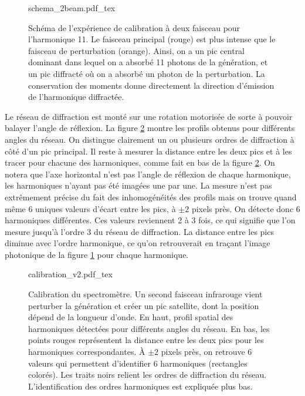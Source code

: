 \begin{figure}[!ht]
\centering
\def\svgwidth{\columnwidth}
{schema_2beam.pdf_tex}
\caption{Schéma de l'expérience de calibration à deux faisceau pour l'harmonique 11. Le faisceau principal (rouge) est plus intense que le faisceau de perturbation (orange). Ainsi, on a un pic central dominant dans lequel on a absorbé 11 photons de la génération, et un pic diffracté où on a absorbé un photon de la perturbation. La conservation des moments donne directement la direction d'émission de l'harmonique diffractée.}
\label{Fig:DiffSchema}
\end{figure}

Le réseau de diffraction est monté sur une rotation motorisée de sorte à pouvoir balayer l'angle de réflexion. La figure \ref{Fig:calibration} montre les profils obtenus pour différents angles du réseau. On distingue clairement un ou plusieurs ordres de diffraction à côté d'un pic principal. Il reste à mesurer la distance entre les deux pics et à les tracer pour chacune des harmoniques, comme fait en bas de la figure \ref{Fig:calibration}. On notera que l'axe horizontal n'est pas l'angle de réflexion de chaque harmonique, les harmoniques n'ayant pas été imagées une par une. La mesure n'est pas extrêmement précise du fait des inhomogénéités des profils mais on trouve quand même 6 uniques valeurs d'écart entre les pics, à $\pm 2$ pixels près. On détecte donc 6 harmoniques différentes. Ces valeurs reviennent 2 à 3 fois, ce qui signifie que l'on mesure jusqu'à l'ordre 3 du réseau de diffraction. La distance entre les pics diminue avec l'ordre harmonique, ce qu'on retrouverait en traçant l'image photonique de la figure \ref{Fig:DiffSchema} pour chaque harmonique.

\begin{figure}[!ht]
\centering
\def\svgwidth{\columnwidth}
{calibration_v2.pdf_tex}
\caption{Calibration du spectromètre. Un second faisceau infrarouge vient perturber la génération et créer un pic satellite, dont la position dépend de la longueur d'onde. En haut, profil spatial des harmoniques détectées pour différents angles du réseau. En bas, les points rouges représentent la distance entre les deux pics pour les harmoniques correspondantes. \`{A} $\pm2$ pixels près, on retrouve 6 valeurs qui permettent d'identifier 6 harmoniques (rectangles colorés). Les traits noirs relient les ordres de diffraction du réseau. L'identification des ordres harmoniques est expliquée plus bas.}
\label{Fig:calibration}
\end{figure}

